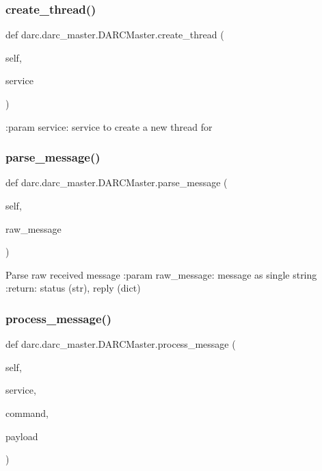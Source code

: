 \subsubsection{\texorpdfstring{create\_thread()}{create\_thread()}}
{\footnotesize\ttfamily def darc.\+darc\+\_\+master.\+D\+A\+R\+C\+Master.\+create\+\_\+thread (\begin{DoxyParamCaption}\item[{}]{self,  }\item[{}]{service }\end{DoxyParamCaption})}

\begin{DoxyVerb}:param service: service to create a new thread for
\end{DoxyVerb}
 \mbox{\label{classdarc_1_1darc__master_1_1_d_a_r_c_master_a589349132ce896bd949a20c33be5c015}} 
\subsubsection{\texorpdfstring{parse\_message()}{parse\_message()}}
{\footnotesize\ttfamily def darc.\+darc\+\_\+master.\+D\+A\+R\+C\+Master.\+parse\+\_\+message (\begin{DoxyParamCaption}\item[{}]{self,  }\item[{}]{raw\+\_\+message }\end{DoxyParamCaption})}

\begin{DoxyVerb}Parse raw received message
:param raw_message: message as single string
:return: status (str), reply (dict)
\end{DoxyVerb}
 \mbox{\label{classdarc_1_1darc__master_1_1_d_a_r_c_master_a83ba9e207dcb4b9f14c6b8d16b66be62}} 
\subsubsection{\texorpdfstring{process\_message()}{process\_message()}}
{\footnotesize\ttfamily def darc.\+darc\+\_\+master.\+D\+A\+R\+C\+Master.\+process\+\_\+message (\begin{DoxyParamCaption}\item[{}]{self,  }\item[{}]{service,  }\item[{}]{command,  }\item[{}]{payload }\end{DoxyParamCaption})}

